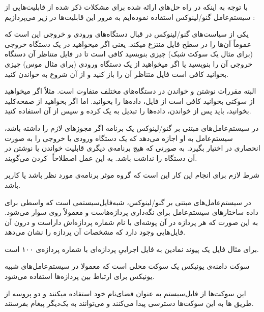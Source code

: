 
با توجه به اینکه در راه حل‌های ارائه شده برای مشکلات ذکر شده از قابلیت‌هایی از سیستم‌عامل گنو/لینوکس استفاده نموده‌ایم به مرور این قابلیت‌ها در زیر می‌پردازیم :


یکی از سیاست‌های گنو/لینوکس در قبال دستگاه‌های ورودی و خروجی این است که عموماً آن‌ها را در سطح فایل منتزع میکند. یعنی اگر میخواهید در یک دستگاه خروجی (برای مثال یک سوکت شبک) چیزی بنویسید کافی است تا در فایل متناظر آن دستگاه خروجی آن را بنویسید یا اگر میخواهید از یک دستگاه ورودی (برای مثال موس) چیزی بخوانید کافی است فایل متناظر آن را باز کنید و از آن شروع به خواندن کنید.

البته مقررات نوشتن و خواندن در دستگاه‌های مختلف متفاوت است. مثلاً اگر میخواهید از سوکتی بخوانید کافی است از فایل، داده‌ها را بخوانید. اما اگر بخواهید از صفحه‌کلید بخوانید، باید پس از خواندن، داده‌ها را تبدیل به یک  کرده و سپس از آن استفاده کنید.


در سیستم‌عامل‌های مبتنی بر گنو/لینوکس یک برنامه اگر مجوز‌های لازم را داشته باشد، سیستم‌عامل به او اجازه می‌دهد که یک دستگاه ورودی یا خروجی را به صورت انحصاری در اختیار بگیرد. به صورتی که هیچ برنامه‌ی دیگری قابلیت خواندن یا نوشتن در آن دستگاه را نداشت باشد. به این عمل اصطلاحاً ‌ کردن می‌گویند. 

شرط لازم برای انجام این کار این است که گروه موثر برنامه‌ی مورد نظر  باشد یا کاربر  باشد.


در سیستم‌عامل‌های مبتنی بر گنو/لینوکس،  شبه‌فایل‌سیستمی است که واسطی برای داده ساختارهای سیستم‌عامل برای نگه‌داری پردازه‌هاست و معمولاً روی  سوار می‌شود. به این صورت که هر پردازه در آن پوشه‌ای با نام شماره پردازه‌اش داراست و درون آن فایل‌هایی وجود دارد که مشخصات آن پردازه را نشان می‌دهد.

برای مثال فایل  یک پیوند نمادین به فایل اجراییِ پردازه‌ای با شماره پردازه‌ی ۱۰۰ است. 


سوکت دامنه‌ی یونیکس یک سوکت محلی است که معمولا در سیستم‌عامل‌های شبیه یونیکس برای ارتباط بین پردازه‌ها  استفاده می‌شود. 

این سوکت‌ها از فایل‌سیستم به عنوان فضای‌نام خود استفاده میکنند و دو پروسه از طریق ها به این سوکت‌ها دسترسی پیدا می‌کنند و می‌توانند به یک‌دیگر پیغام بفرستند.

